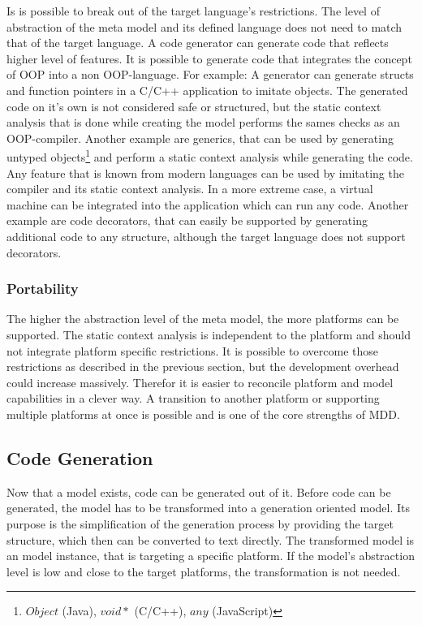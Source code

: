 Is is possible to break out of the target language's restrictions.
The level of abstraction of the meta model and its defined language does not need to match that of the target language.
A code generator can generate code that reflects higher level of features.
It is possible to generate code that integrates the concept of \ac{OOP} into a non \ac{OOP}-language.
For example: A generator can generate structs and function pointers in a C/C++ application to imitate objects.
The generated code on it's own is not considered safe or structured, but the static context analysis that is done while creating the model performs the sames checks as an \ac{OOP}-compiler.
Another example are generics, that can be used by generating untyped objects\footnote{$Object$ (Java), $void*$ (C/C++), $any$ (JavaScript)} and perform a static context analysis while generating the code.
Any feature that is known from modern languages can be used by imitating the compiler and its static context analysis.
In a more extreme case, a virtual machine can be integrated into the application which can run any code.
Another example are code decorators, that can easily be supported by generating additional code to any structure, although the target language does not support decorators. 

\subsubsection{Portability}

The higher the abstraction level of the meta model, the more platforms can be supported.
The static context analysis is independent to the platform and should not integrate platform specific restrictions.
It is possible to overcome those restrictions as described in the previous section, but the development overhead could increase massively.
Therefor it is easier to reconcile platform and model capabilities in a clever way.
A transition to another platform or supporting multiple platforms at once is possible and is one of the core strengths of \ac{MDD}.

\subsection{Code Generation}
\label{sec:generation}

Now that a model exists, code can be generated out of it.
Before code can be generated, the model has to be transformed into a generation oriented model.
Its purpose is the simplification of the generation process by providing the target structure, which then can be converted to text directly.
The transformed model is an model instance, that is targeting a specific platform.
If the model's abstraction level is low and close to the target platforms, the transformation is not needed.

